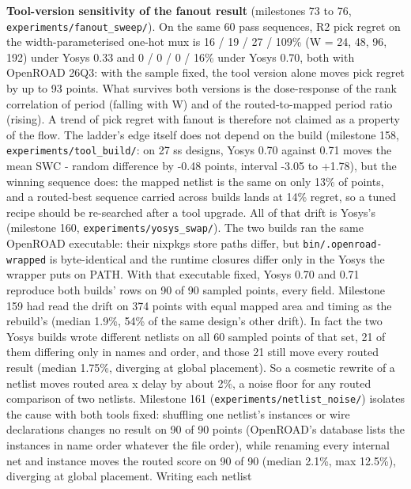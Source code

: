 \documentclass[conference]{IEEEtran}
\begin{document}
\textbf{Tool-version sensitivity of the fanout result} (milestones 73 to
76, \texttt{experiments/\allowbreak{}fanout\_\allowbreak{}sweep/\allowbreak{}}). On the same 60 pass sequences,
R2 pick regret on the width-parameterised one-hot mux is 16 / 19 / 27 /
109\% (W = 24, 48, 96, 192) under Yosys 0.33 and 0 / 0 / 0 / 16\% under
Yosys 0.70, both with OpenROAD 26Q3: with the sample fixed, the tool
version alone moves pick regret by up to 93 points. What survives both
versions is the dose-response of the rank correlation of period (falling
with W) and of the routed-to-mapped period ratio (rising). A trend of
pick regret with fanout is therefore not claimed as a property of the
flow. The ladder's edge itself does not depend on the build (milestone
158, \texttt{experiments/\allowbreak{}tool\_\allowbreak{}build/\allowbreak{}}: on 27 ss designs, Yosys 0.70
against 0.71 moves the mean SWC - random difference by -0.48 points,
interval -3.05 to +1.78), but the winning sequence does: the mapped
netlist is the same on only 13\% of points, and a routed-best sequence
carried across builds lands at 14\% regret, so a tuned recipe should be
re-searched after a tool upgrade. All of that drift is Yosys's
(milestone 160, \texttt{experiments/\allowbreak{}yosys\_\allowbreak{}swap/\allowbreak{}}). The two builds ran
the same OpenROAD executable: their nixpkgs store paths differ, but
\texttt{bin/\allowbreak{}.openroad-wrapped} is byte-identical and the runtime
closures differ only in the Yosys the wrapper puts on PATH. With that
executable fixed, Yosys 0.70 and 0.71 reproduce both builds' rows on 90
of 90 sampled points, every field. Milestone 159 had read the drift on
374 points with equal mapped area and timing as the rebuild's (median
1.9\%, 54\% of the same design's other drift). In fact the two Yosys
builds wrote different netlists on all 60 sampled points of that set, 21
of them differing only in names and order, and those 21 still move every
routed result (median 1.75\%, diverging at global placement). So a
cosmetic rewrite of a netlist moves routed area x delay by about 2\%, a
noise floor for any routed comparison of two netlists. Milestone 161
(\texttt{experiments/\allowbreak{}netlist\_\allowbreak{}noise/\allowbreak{}}) isolates the cause with both
tools fixed: shuffling one netlist's instances or wire declarations
changes no result on 90 of 90 points (OpenROAD's database lists the
instances in name order whatever the file order), while renaming every
internal net and instance moves the routed score on 90 of 90 (median
2.1\%, max 12.5\%), diverging at global placement. Writing each netlist
\end{document}
